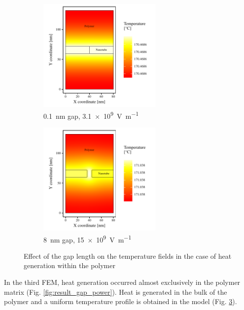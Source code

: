 \documentclass[11pt,review,times]{elsarticle}
\begin{document}
\begin{figure}[htb]
	\centering
	\begin{subfigure}{60mm}
		\centering
		\captionsetup{width=55mm}
		\includegraphics[width=60mm]{resultats_0,1nm_comsol_2D_temp}
		\caption{\SI{0.1}{\nano\metre} gap, \SI{3.1e9}{\volt\per\metre}}
		\label{fig:result_gap01nm_temp}		
	\end{subfigure} 
	\begin{subfigure}{60mm}
		\centering
		\captionsetup{width=55mm}
		\includegraphics[width=60mm]{resultats_8nm_comsol_2D_temp}
		\caption{\SI{8}{\nano\metre} gap, \SI{15e9}{\volt\per\metre}}
		\label{fig:result_gap8nm_temp}		
	\end{subfigure}
	\caption{Effect of the gap length on the temperature fields in the case of heat generation within the polymer}
	\label{fig:result_gap_temp}
\end{figure}

In the third FEM, heat generation occurred almost exclusively in the polymer matrix (Fig. \ref{fig:result_gap_power}). 
Heat is generated in the bulk of the polymer and a uniform temperature profile is obtained in the model (Fig. \ref{fig:result_gap_temp}). 

\FloatBarrier
\end{document}
